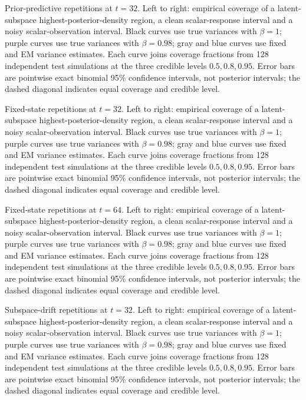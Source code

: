\caption{Prior-predictive repetitions at $t=32$. Left to right: empirical coverage of a latent-subspace highest-posterior-density region, a clean scalar-response interval and a noisy scalar-observation interval. Black curves use true variances with $\beta=1$; purple curves use true variances with $\beta=0.98$; gray and blue curves use fixed and EM variance estimates. Each curve joins coverage fractions from 128 independent test simulations at the three credible levels $0.5,0.8,0.95$. Error bars are pointwise exact binomial 95\% confidence intervals, not posterior intervals; the dashed diagonal indicates equal coverage and credible level.}

\caption{Fixed-state repetitions at $t=32$. Left to right: empirical coverage of a latent-subspace highest-posterior-density region, a clean scalar-response interval and a noisy scalar-observation interval. Black curves use true variances with $\beta=1$; purple curves use true variances with $\beta=0.98$; gray and blue curves use fixed and EM variance estimates. Each curve joins coverage fractions from 128 independent test simulations at the three credible levels $0.5,0.8,0.95$. Error bars are pointwise exact binomial 95\% confidence intervals, not posterior intervals; the dashed diagonal indicates equal coverage and credible level.}

\caption{Fixed-state repetitions at $t=64$. Left to right: empirical coverage of a latent-subspace highest-posterior-density region, a clean scalar-response interval and a noisy scalar-observation interval. Black curves use true variances with $\beta=1$; purple curves use true variances with $\beta=0.98$; gray and blue curves use fixed and EM variance estimates. Each curve joins coverage fractions from 128 independent test simulations at the three credible levels $0.5,0.8,0.95$. Error bars are pointwise exact binomial 95\% confidence intervals, not posterior intervals; the dashed diagonal indicates equal coverage and credible level.}

\caption{Subspace-drift repetitions at $t=32$. Left to right: empirical coverage of a latent-subspace highest-posterior-density region, a clean scalar-response interval and a noisy scalar-observation interval. Black curves use true variances with $\beta=1$; purple curves use true variances with $\beta=0.98$; gray and blue curves use fixed and EM variance estimates. Each curve joins coverage fractions from 128 independent test simulations at the three credible levels $0.5,0.8,0.95$. Error bars are pointwise exact binomial 95\% confidence intervals, not posterior intervals; the dashed diagonal indicates equal coverage and credible level.}

